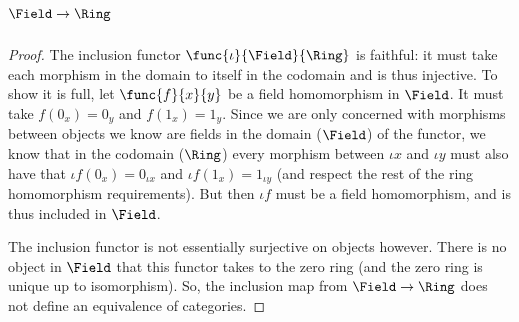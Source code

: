 \documentclass[../../main]{subfiles}
\begin{document}
\subparagraph{\(\Field\to\Ring\)}
\begin{proof}
	The inclusion functor $\func{\iota}{\Field}{\Ring}$ is faithful: it must
	take each morphism in the domain to itself in the codomain and is thus
	injective. To show it is full, let $\func{f}{x}{y}$ be a field homomorphism
	in $\Field$. It must take $f(0_x)=0_y$ and $f(1_x)=1_y$. Since we are only
	concerned with morphisms between objects we know are fields in the domain
	($\Field$) of the functor, we know that in the codomain ($\Ring$) every
	morphism between $\iota x$ and $\iota y$ must also have that $\iota f(0_x) =
	0_{\iota x}$ and $\iota f(1_x) = 1_{\iota y}$ (and respect the rest of the
	ring homomorphism requirements). But then $\iota f$ must be a field
	homomorphism, and is thus included in $\Field$.

	The inclusion functor is not essentially surjective on objects however. There
	is no object in $\Field$ that this functor takes to the zero ring (and the
	zero ring is unique up to isomorphism). So, the inclusion map from
	$\Field\to\Ring$ does not define an equivalence of categories.
\end{proof}
\end{document}
